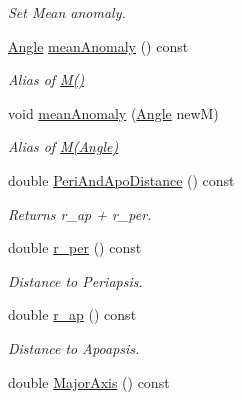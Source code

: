 \begin{DoxyCompactItemize}
\begin{DoxyCompactList}\small\item\em Set Mean anomaly. \end{DoxyCompactList}\item 
\hypertarget{class_orbit3_d_ad4d38b96390a2a65579def92bfdb8895}{\hyperlink{class_angle}{Angle} \hyperlink{class_orbit3_d_ad4d38b96390a2a65579def92bfdb8895}{mean\+Anomaly} () const }\label{class_orbit3_d_ad4d38b96390a2a65579def92bfdb8895}

\begin{DoxyCompactList}\small\item\em Alias of \hyperlink{class_orbit3_d_ac6eb0ccc3e3422d88210d0f4c8d56250}{M()} \end{DoxyCompactList}\item 
\hypertarget{class_orbit3_d_a44b20386eba600bda7aa63486d31b9a9}{void \hyperlink{class_orbit3_d_a44b20386eba600bda7aa63486d31b9a9}{mean\+Anomaly} (\hyperlink{class_angle}{Angle} new\+M)}\label{class_orbit3_d_a44b20386eba600bda7aa63486d31b9a9}

\begin{DoxyCompactList}\small\item\em Alias of \hyperlink{class_orbit3_d_abf5cf8df54ccd9fb475e9565ea2b422c}{M(\+Angle)} \end{DoxyCompactList}\item 
double \hyperlink{class_orbit3_d_a2ba287a7401e69dd5181eb6bc2e44b24}{Peri\+And\+Apo\+Distance} () const 
\begin{DoxyCompactList}\small\item\em Returns r\+\_\+ap + r\+\_\+per. \end{DoxyCompactList}\item 
\hypertarget{class_orbit3_d_a305560357a9d598bc0d3d0d6841ec3c7}{double \hyperlink{class_orbit3_d_a305560357a9d598bc0d3d0d6841ec3c7}{r\+\_\+per} () const }\label{class_orbit3_d_a305560357a9d598bc0d3d0d6841ec3c7}

\begin{DoxyCompactList}\small\item\em Distance to Periapsis. \end{DoxyCompactList}\item 
\hypertarget{class_orbit3_d_a7021c6cde96f0b8aceccaa13dd6fbca5}{double \hyperlink{class_orbit3_d_a7021c6cde96f0b8aceccaa13dd6fbca5}{r\+\_\+ap} () const }\label{class_orbit3_d_a7021c6cde96f0b8aceccaa13dd6fbca5}

\begin{DoxyCompactList}\small\item\em Distance to Apoapsis. \end{DoxyCompactList}\item 
\hypertarget{class_orbit3_d_aecb936f5a84502c2d6254671b890ac92}{double \hyperlink{class_orbit3_d_aecb936f5a84502c2d6254671b890ac92}{Major\+Axis} () const }\label{class_orbit3_d_aecb936f5a84502c2d6254671b890ac92}


\end{DoxyCompactItemize}
